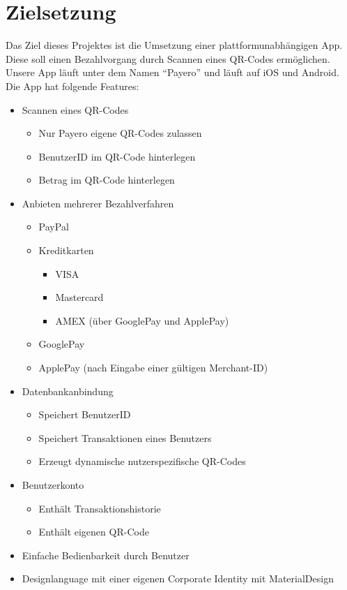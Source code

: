 
\chapter{Zielsetzung}

Das Ziel dieses Projektes ist die Umsetzung einer plattformunabhängigen App.
Diese soll einen Bezahlvorgang durch Scannen eines QR-Codes ermöglichen.
Unsere App läuft unter dem Namen ``Payero'' und läuft auf iOS und Android.
Die App hat folgende Features:

\begin{itemize}
    \item Scannen eines QR-Codes
    \begin{itemize}
        \item Nur Payero eigene QR-Codes zulassen
        \item BenutzerID im QR-Code hinterlegen
        \item Betrag im QR-Code hinterlegen
    \end{itemize}
    \item Anbieten mehrerer Bezahlverfahren
    \begin{itemize}
        \item PayPal
        \item Kreditkarten
        \begin{itemize}
            \item VISA
            \item Mastercard
            \item AMEX (über GooglePay und ApplePay)
        \end{itemize}
        \item GooglePay
        \item ApplePay (nach Eingabe einer gültigen Merchant-ID)
    \end{itemize}
    \item Datenbankanbindung
    \begin{itemize}
        \item Speichert BenutzerID
        \item Speichert Transaktionen eines Benutzers
        \item Erzeugt dynamische nutzerspezifische QR-Codes
    \end{itemize}
    \item Benutzerkonto
    \begin{itemize}
        \item Enthält Transaktionshistorie
        \item Enthält eigenen QR-Code
    \end{itemize}
    \item Einfache Bedienbarkeit durch Benutzer
    \item Designlanguage mit einer eigenen Corporate Identity mit MaterialDesign
\end{itemize}